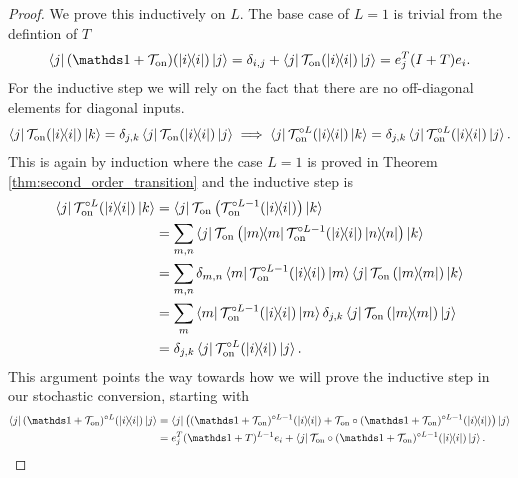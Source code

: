 \begin{proof}
    We prove this inductively on $L$. The base case of $L = 1$ is trivial from the defintion of $T$
    \begin{align}
    \bra{j} (\identity + \mathcal{T}_{\on})(\ketbra{i}{i}) \ket{j} = \delta_{i,j} + \bra{j} \mathcal{T}_{\on}(\ketbra{i}{i}) \ket{j} = e_j^T (I +  T) e_i.
\end{align}
For the inductive step we will rely on the fact that there are no off-diagonal elements for diagonal inputs. 
\begin{align}
    \bra{j} \mathcal{T}_{\rm on} (\ketbra{i}{i}) \ket{k} = \delta_{j,k} \bra{j} \mathcal{T}_{\rm on} (\ketbra{i}{i}) \ket{j} \implies \bra{j} \mathcal{T}_{\rm on}^{\circ L} (\ketbra{i}{i}) \ket{k} = \delta_{j,k} \bra{j} \mathcal{T}_{\rm on}^{\circ L} (\ketbra{i}{i}) \ket{j}.
\end{align}
This is again by induction where the case $L = 1$ is proved in Theorem \ref{thm:second_order_transition} and the inductive step is 
\begin{align}
    \bra{j} \mathcal{T}_{\rm on}^{\circ L} (\ketbra{i}{i}) \ket{k} &= \bra{j} \mathcal{T}_{\rm on} \left( \mathcal{T}_{\rm on}^{\circ L - 1} (\ketbra{i}{i}) \right) \ket{k} \\
    &= \sum_{m, n} \bra{j} \mathcal{T}_{\rm on}\left( \ketbra{m}{m}\mathcal{T}_{\rm on}^{\circ L - 1}(\ketbra{i}{i}) \ketbra{n}{n}\right) \ket{k} \\
    &= \sum_{m, n} \delta_{m,n} \bra{m}\mathcal{T}_{\rm on}^{\circ L - 1}(\ketbra{i}{i}) \ket{m} \bra{j} \mathcal{T}_{\rm on}\left(   \ketbra{m}{m} \right) \ket{k} \\
    &= \sum_{m} \bra{m}\mathcal{T}_{\rm on}^{\circ L - 1}(\ketbra{i}{i}) \ket{m} \delta_{j,k} \bra{j} \mathcal{T}_{\rm on}\left(   \ketbra{m}{m} \right) \ket{j} \\
    &= \delta_{j,k} \bra{j} \mathcal{T}_{\rm on}^{\circ L} (\ketbra{i}{i}) \ket{j}.
\end{align} 
This argument points the way towards how we will prove the inductive step in our stochastic conversion, starting with
\begin{align}
    \bra{j} (\identity + \mathcal{T}_{\on})^{\circ L}(\ketbra{i}{i}) \ket{j} &= \bra{j} \left( (\identity + \mathcal{T}_{\on})^{\circ L - 1} (\ketbra{i}{i}) + \mathcal{T}_{\on} \circ (\identity + \mathcal{T}_{\on})^{\circ L - 1} (\ketbra{i}{i}) \right)\ket{j} \\
    &= e_j^T (\identity + T)^{L - 1} e_i + \bra{j} \mathcal{T}_{\on} \circ (\identity + \mathcal{T}_{\on})^{\circ L - 1} (\ketbra{i}{i}) \ket{j} . \label{eq:matrix_reloaded1}

\end{align}
\end{proof}
